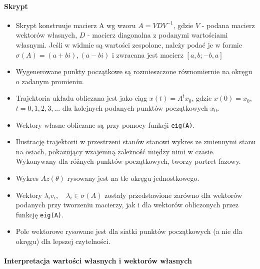 \documentclass[a4paper, 12pt]{article}
\begin{document}
	
	\paragraph{Skrypt}
	\begin{itemize}
		\item Skrypt konstruuje macierz A wg wzoru $A = VDV^{-1}$, gdzie $V$ - podana macierz wektorów własnych, $D$ - macierz diagonalna z podanymi wartościami własnymi. Jeśli w widmie są wartości zespolone, należy podać je w formie $\sigma(A)={(a+bi),(a-bi)}$ i zwracana jest macierz $[a,b;-b,a]$
		\item Wygenerowane punkty początkowe są rozmieszczone równomiernie na okręgu o zadanym promieniu.
		\item Trajektoria układu obliczana jest jako ciąg $x(t)=A^tx_0$, gdzie $x(0)=x_0$, $t = 0,1,2,3,...$ dla kolejnych podanych punktów początkowych $x_0$.
		\item Wektory własne obliczane są przy pomocy funkcji \verb|eig(A)|.
		\item Ilustrację trajektorii w przestrzeni stanów stanowi wykres ze zmiennymi stanu na osiach, pokazujący wzajemną zależność między nimi w czasie. Wykonywany dla różnych punktów początkowych, tworzy portret fazowy.
		\item Wykres $Az(\theta)$ rysowany jest na tle okręgu jednostkowego.
		\item Wektory $\lambda _iv_i,\quad \lambda _i \in \sigma (A)$ zostały przedstawione zarówno dla wektorów podanych przy tworzeniu macierzy, jak i dla wektorów obliczonych przez funkcję \verb|eig(A)|.
		\item Pole wektorowe rysowane jest dla siatki punktów początkowych (a nie dla okręgu) dla lepszej czytelności.
	\end{itemize}
	
	\paragraph{Interpretacja wartości własnych i wektorów własnych}
	
\end{document}
